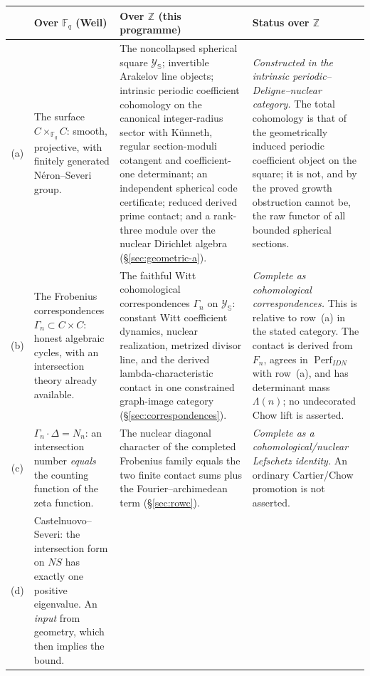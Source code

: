 \documentclass[11pt]{amsart}
\theoremstyle{definition}
\theoremstyle{remark}
\newcommand{\Z}{\mathbb Z}
\begin{document}
\begingroup
\footnotesize
\setlength{\tabcolsep}{4pt}
\renewcommand{\arraystretch}{1.25}
\noindent
\begin{tabularx}{\textwidth}{@{}c p{} p{} Y@{}}
\toprule
 & \textbf{Over $\mathbb F_q$ (Weil)} & \textbf{Over $\Z$ (this programme)}
 & \textbf{Status over $\Z$} \\
\midrule
(a) &
The surface $C\times_{\mathbb F_q}C$: smooth, projective, with finitely
generated Néron--Severi group. &
The noncollapsed spherical square $\mathscr Y_{\mathbb S}$; invertible
Arakelov line objects; intrinsic periodic coefficient cohomology on the
canonical integer-radius sector with
K\"unneth, regular section-moduli cotangent and coefficient-one determinant;
an independent spherical code certificate; reduced derived prime contact; and a
rank-three module over the nuclear Dirichlet algebra
(\S\ref{sec:geometric-a}). &
\emph{Constructed in the intrinsic periodic--Deligne--nuclear category.}
The total cohomology is that of the geometrically induced periodic
coefficient object on the square; it is not, and by the proved growth
obstruction cannot be, the raw functor of all bounded spherical sections.
\\
\addlinespace
(b) &
The Frobenius correspondences $\Gamma_n\subset C\times C$: honest algebraic
cycles, with an intersection theory already available. &
The faithful Witt cohomological correspondences $\Gamma_n$ on
$\mathscr Y_{\mathbb S}$: constant Witt coefficient dynamics, nuclear
realization, metrized divisor line, and the derived
lambda-characteristic contact
in one constrained graph-image category (\S\ref{sec:correspondences}). &
\emph{Complete as cohomological correspondences.}  This is relative to
row~(a) in the stated category.  The contact is derived from $F_n$, agrees
in $\operatorname{Perf}_{IDN}$ with row~(a), and has determinant mass
$\Lambda(n)$; no
undecorated Chow lift is asserted. \\
\addlinespace
(c) &
$\Gamma_n\cdot\Delta=N_n$: an intersection number \emph{equals} the counting
function of the zeta function. &
The nuclear diagonal character of the completed Frobenius family equals
the two finite contact sums plus the Fourier--archimedean term
(\S\ref{sec:rowc}). &
\emph{Complete as a cohomological/nuclear Lefschetz identity.}  An ordinary
Cartier/Chow promotion is not asserted. \\
\addlinespace
(d) &
Castelnuovo--Severi: the intersection form on $NS$ has exactly one positive
eigenvalue.  An \emph{input} from geometry, which then implies the bound. &

\end{tabularx}
\end{document}

